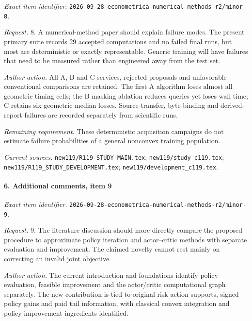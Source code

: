 \emph{Exact item identifier.} \nolinkurl{2026-09-28-econometrica-numerical-methods-r2/minor-8}.

\par\emph{Request.} 8. A numerical-method paper should explain failure modes. The present primary suite records 29 accepted computations and no failed final runs, but most are deterministic or exactly representable. Generic training will have failures that need to be measured rather than engineered away from the test set.

\par\emph{Author action.} All A, B and C services, rejected proposals and unfavorable conventional comparisons are retained. The first A algorithm loses almost all geometric timing cells; the B masking ablation reduces queries yet loses wall time; C retains six geometric median losses. Source-transfer, byte-binding and derived-report failures are recorded separately from scientific runs.

\par\emph{Remaining requirement.} These deterministic acquisition campaigns do not estimate failure probabilities of a general nonconvex training population.

\par\emph{Current sources.} \nolinkurl{new119/R119_STUDY_MAIN.tex}; \nolinkurl{new119/study_c119.tex}; \nolinkurl{new119/R119_STUDY_DEVELOPMENT.tex}; \nolinkurl{new119/development_c119.tex}.

\paragraph{6. Additional comments, item 9}

\emph{Exact item identifier.} \nolinkurl{2026-09-28-econometrica-numerical-methods-r2/minor-9}.

\par\emph{Request.} 9. The literature discussion should more directly compare the proposed procedure to approximate policy iteration and actor--critic methods with separate evaluation and improvement. The claimed novelty cannot rest mainly on correcting an invalid joint objective.

\par\emph{Author action.} The current introduction and foundations identify policy evaluation, feasible improvement and the actor/\allowbreak{}critic computational graph separately. The new contribution is tied to original-risk action supports, signed policy gains and paid tail information, with classical convex integration and policy-improvement ingredients identified.

